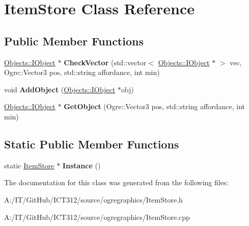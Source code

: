 \hypertarget{class_item_store}{\section{Item\-Store Class Reference}
\label{class_item_store}
}
\subsection*{Public Member Functions}
\begin{DoxyCompactItemize}
\item 
\hypertarget{class_item_store_a1d378aa7abf88f7cbc121375e7ca5031}{\hyperlink{class_objects_1_1_i_object}{Objects\-::\-I\-Object} $\ast$ {\bfseries Check\-Vector} (std\-::vector$<$ \hyperlink{class_objects_1_1_i_object}{Objects\-::\-I\-Object} $\ast$ $>$ vec, Ogre\-::\-Vector3 pos, std\-::string affordance, int min)}\label{class_item_store_a1d378aa7abf88f7cbc121375e7ca5031}

\item 
\hypertarget{class_item_store_aed446ce89416e3f01d68f70680781e9b}{void {\bfseries Add\-Object} (\hyperlink{class_objects_1_1_i_object}{Objects\-::\-I\-Object} $\ast$obj)}\label{class_item_store_aed446ce89416e3f01d68f70680781e9b}

\item 
\hypertarget{class_item_store_a9998af551c609a934f0d4c0483bf1f75}{\hyperlink{class_objects_1_1_i_object}{Objects\-::\-I\-Object} $\ast$ {\bfseries Get\-Object} (Ogre\-::\-Vector3 pos, std\-::string affordance, int min)}\label{class_item_store_a9998af551c609a934f0d4c0483bf1f75}

\end{DoxyCompactItemize}
\subsection*{Static Public Member Functions}
\begin{DoxyCompactItemize}
\item 
\hypertarget{class_item_store_a23c8996f3a5b116088a954efc6c836b4}{static \hyperlink{class_item_store}{Item\-Store} $\ast$ {\bfseries Instance} ()}\label{class_item_store_a23c8996f3a5b116088a954efc6c836b4}

\end{DoxyCompactItemize}


The documentation for this class was generated from the following files\-:\begin{DoxyCompactItemize}
\item 
A\-:/\-I\-T/\-Git\-Hub/\-I\-C\-T312/source/ogregraphics/Item\-Store.\-h\item 
A\-:/\-I\-T/\-Git\-Hub/\-I\-C\-T312/source/ogregraphics/Item\-Store.\-cpp\end{DoxyCompactItemize}
